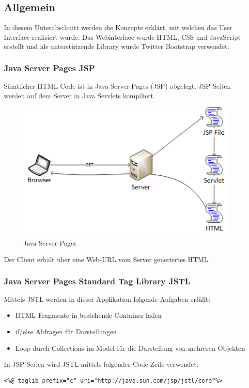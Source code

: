 \subsection{Allgemein}
In diesem Unterabschnitt werden die Konzepte erklärt, mit welchen das User Interface realisiert wurde. Das Webinterface wurde HTML, CSS und JavaScript erstellt und als unterstützende Library wurde Twitter Bootstrap verwendet.

\subsubsection{Java Server Pages JSP}
Sämtlicher HTML Code ist in Java Server Pages (JSP) abgelegt. JSP Seiten werden auf dem Server in Java Servlets kompiliert.
\begin{figure}[H]
\centering
\includegraphics[scale=1]{../04_Realisierung/images/userinterface/jsp.png}
\caption{Java Server Pages}
\end{figure}
Der Client erhält über eine Web-URL vom Server generiertes HTML.

\subsubsection{Java Server Pages Standard Tag Library JSTL}
Mittels JSTL werden in dieser Applikation folgende Aufgaben erfüllt:
\begin{itemize}
\item HTML Fragmente in bestehende Container laden
\item if/else Abfragen für Darstellungen
\item Loop durch Collections im Model für die Darstellung von mehreren Objekten
\end{itemize}

In JSP Seiten wird JSTL mittels folgender Code-Zeile verwendet:
\begin{lstlisting}[language=html5]
<%@ taglib prefix="c" uri="http://java.sun.com/jsp/jstl/core"%>
\end{lstlisting}

